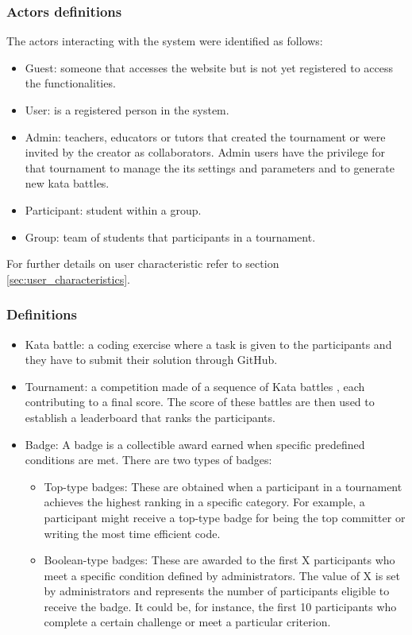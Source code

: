 \documentclass{article}
\begin{document}
            \subsubsection{Actors definitions}\label{sec:actor_definitions}
                The actors interacting with the system were identified as follows:
                \begin {itemize}
                    \item Guest: someone that accesses the website but is not yet registered to access the functionalities.
                    \item User: is a registered person in the system.
                    \item Admin: teachers, educators or tutors that created the tournament or were invited by the creator as collaborators. Admin users have the privilege for that tournament to manage the its settings and parameters and to generate new kata battles.
                    \item Participant: student within a group. 
                    \item Group: team of students that participants in a tournament.
                \end {itemize}
                For further details on user characteristic refer to section \ref{sec:user_characteristics}.
            \subsubsection{Definitions}
                \begin {itemize}
                    \item Kata battle: a coding exercise where a task is given to the participants and they have to submit their solution through GitHub.
                    \item Tournament: a competition made of a sequence of Kata battles , each contributing to a final score. The score of these battles are then used to establish a leaderboard that ranks the participants.
                    \item Badge: A badge is a collectible award earned when specific predefined conditions are met. There are two types of badges:
                    \begin {itemize} 
                        \item Top-type badges: These are obtained when a participant in a tournament achieves the highest ranking in a specific category. For example, a participant might receive a top-type badge for being the top committer or writing the most time efficient code.
                        \item Boolean-type badges: These are awarded to the first X participants who meet a specific condition defined by administrators. The value of X is set by administrators and represents the number of participants eligible to receive the badge. It could be, for instance, the first 10 participants who complete a certain challenge or meet a particular criterion.
                    \end {itemize}
                \end {itemize}
                    
\end{document}
